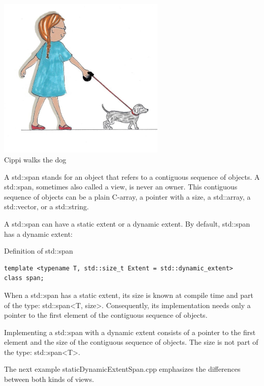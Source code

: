 \begin{center}
\includegraphics[width=0.6\textwidth]{content/3/chapter5/images/3.png}\\
Cippi walks the dog
\end{center}

A std::span stands for an object that refers to a contiguous sequence of objects. A std::span, sometimes also called a view, is never an owner. This contiguous sequence of objects can be a plain C-array, a pointer with a size, a std::array, a std::vector, or a std::string.

A std::span can have a static extent or a dynamic extent. By default, std::span has a dynamic extent:

\noindent
Definition of std::span
\begin{lstlisting}[style=styleCXX]
template <typename T, std::size_t Extent = std::dynamic_extent>
class span;
\end{lstlisting}


When a std::span has a static extent, its size is known at compile time and part of the type: std::span<T, size>. Consequently, its implementation needs only a pointer to the first element of the contiguous sequence of objects.

Implementing a std::span with a dynamic extent consists of a pointer to the first element and the size of the contiguous sequence of objects. The size is not part of the type: std::span<T>.

The next example staticDynamicExtentSpan.cpp emphasizes the differences between both kinds of views.

